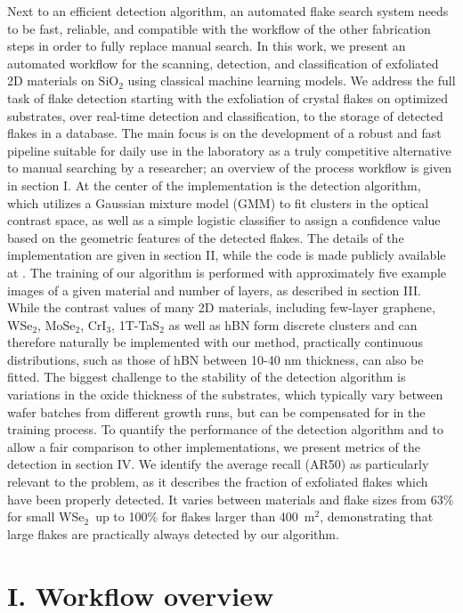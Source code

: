 \documentclass[reprint, prl, superscriptaddress, floatfix]{revtex4-2}
\newcommand{\WSe}{WSe$_2$}
\begin{document}
Next to an efficient detection algorithm, an automated flake search system needs to be fast, reliable, and compatible with the workflow of the other fabrication steps in order to fully replace manual search.
In this work, we present an automated workflow for the scanning, detection, and classification of exfoliated 2D materials on $\mathrm{SiO_2}$ using classical machine learning models. 
We address the full task of flake detection starting with the exfoliation of crystal flakes on optimized substrates, over real-time detection and classification, to the storage of detected flakes in a database.
The main focus is on the development of a robust and fast pipeline suitable for daily use in the laboratory as a truly competitive alternative to manual searching by a researcher; an overview of the process workflow is given in section I. 
At the center of the implementation is the detection algorithm, which utilizes a Gaussian mixture model (GMM) to fit clusters in the optical contrast space, as well as a simple logistic classifier to assign a confidence value based on the geometric features of the detected flakes.
The details of the implementation are given in section II, while the code is made publicly available at \cite{code}.
The training of our algorithm is performed with approximately five example images of a given material and number of layers, as described in section III. 
While the contrast values of many 2D materials, including few-layer graphene, WSe$_2$, MoSe$_2$, CrI$_3$, 1T-TaS$_2$ as well as hBN form discrete clusters and can therefore naturally be implemented with our method, practically continuous distributions, such as those of hBN between 10-40 nm thickness, can also be fitted. 
The biggest challenge to the stability of the detection algorithm is variations in the oxide thickness of the substrates, which typically vary between wafer batches from different growth runs, but can be compensated for in the training process.  
To quantify the performance of the detection algorithm and to allow a fair comparison to other implementations, we present metrics of the detection in section IV.  
We identify the average recall (AR50) as particularly relevant to the problem, as it describes the fraction of exfoliated flakes which have been properly detected.
It varies between materials and flake sizes from 63\% for small \WSe\ up to 100\% for flakes larger than 400~\textmu m$^2$, demonstrating that large flakes are practically always detected by our algorithm.  


\section{I. Workflow overview}
\end{document}
